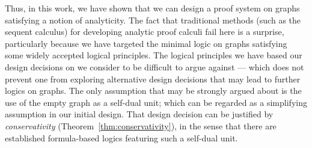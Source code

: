 \documentclass{lmcs} %
\theoremstyle{plain}
\begin{document}
Thus, in this work, we have shown that we can design a proof system on graphs satisfying a notion of analyticity.
The fact that traditional methods (such as the sequent calculus) for developing analytic proof calculi fail here is a surprise, particularly because we have targeted the minimal logic on graphs satisfying some widely accepted logical principles.
The logical principles we have based our design decisions on we consider to be difficult to argue against --- which does not prevent one from exploring alternative design decisions that may lead to further logics on graphs.
The only assumption that may be strongly argued about is the use of the empty graph as a self-dual unit; which can be regarded as a simplifying assumption in our initial design.
That design decision can be justified by \textit{conservativity} (Theorem~\ref{thm:conservativity}), in the sense that there are established formula-based logics featuring such a self-dual unit.  
\end{document}
